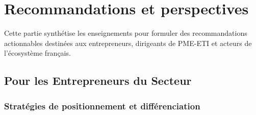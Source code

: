 \chapter{Recommandations et perspectives}
\label{chap:recommendations}

Cette partie synthétise les enseignements pour formuler des recommandations actionnables destinées aux entrepreneurs, dirigeants de PME-ETI et acteurs de l'écosystème français.

\section{Pour les Entrepreneurs du Secteur}

\subsection{Stratégies de positionnement et différenciation}

